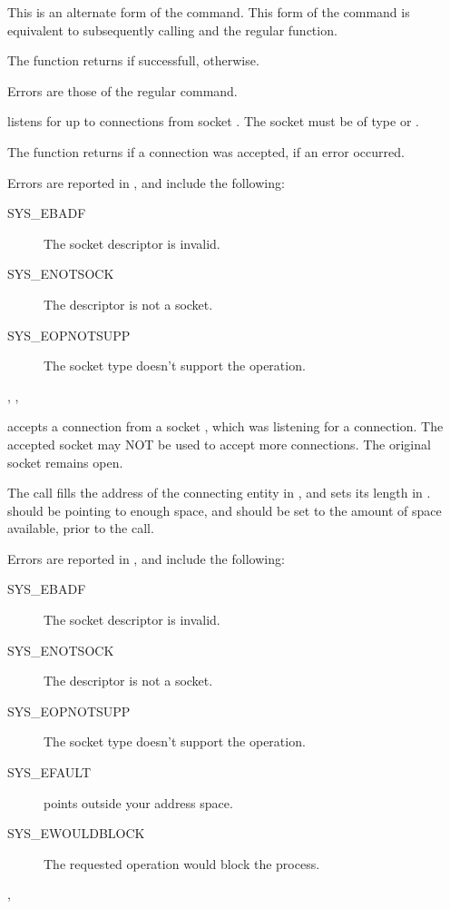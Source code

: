 {This is an alternate form of the  command.
This form of the  command is equivalent to subsequently 
calling  and the regular  function.

The function returns  if successfull,  otherwise.
}
{Errors are those of the regular  command.}
{}


{ listens for up to  connections from socket
. The socket  must be of type  or
.

The function returns  if a connection was accepted,  
if an error occurred.
}
{Errors are reported in , and include the following:
\begin{description}
\item[SYS\_EBADF] The socket descriptor is invalid.
\item[SYS\_ENOTSOCK] The descriptor is not a socket.
\item[SYS\_EOPNOTSUPP] The socket type doesn't support the 
operation.
\end{description}
}{, , }

{ accepts a connection from a socket , which was
listening for a connection. The accepted socket may NOT be used to accept
more connections. The original socket remains open.

The  call fills the address of the connecting entity in ,
and sets its length in .  should be pointing to
enough space, and  should be set to the amount of space
available, prior to the call.
}
{Errors are reported in , and include the following:
\begin{description}
\item[SYS\_EBADF] The socket descriptor is invalid.
\item[SYS\_ENOTSOCK] The descriptor is not a socket.
\item[SYS\_EOPNOTSUPP] The socket type doesn't support the 
operation.
\item[SYS\_EFAULT]  points outside your address space.
\item[SYS\_EWOULDBLOCK] The requested operation would block the process.
\end{description}
}
{, }


